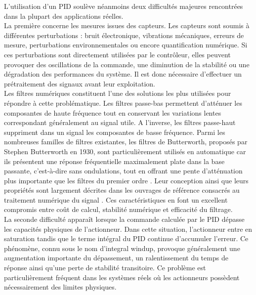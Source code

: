 L'utilisation d'un PID soulève néanmoins deux difficultés majeures rencontrées dans la plupart des applications réelles. \\

La première concerne les mesures issues des capteurs. Les capteurs sont soumis à différentes perturbations : bruit électronique, vibrations mécaniques, erreurs de mesure, perturbations environnementales ou encore quantification numérique. Si ces perturbations sont directement utilisées par le contrôleur, elles peuvent provoquer des oscillations de la commande, une diminution de la stabilité ou une dégradation des performances du système. Il est donc nécessaire d'effectuer un prétraitement des signaux avant leur exploitation. \\

Les filtres numériques constituent l'une des solutions les plus utilisées pour répondre à cette problématique. Les filtres passe-bas permettent d'atténuer les composantes de haute fréquence tout en conservant les variations lentes correspondant généralement au signal utile. 
A l'inverse, les filtres passe-haut suppriment dans un signal les composantes de basse fréquence. Parmi les nombreuses familles de filtres existantes, les filtres de Butterworth, proposés par Stephen Butterworth en 1930, sont particulièrement utilisés en automatique car ils présentent une réponse fréquentielle maximalement plate dans la base passante, c'est-à-dire sans ondulations, tout en offrant une pente d'atténuation plus importante que les filtres du premier ordre \cite{butterworth1930}. Leur conception ainsi que leurs propriétés sont largement décrites dans les ouvrages de référence consacrés au traitement numérique du signal \cite{oppenheim2010,orfanidis1996}. Ces caractéristiques en font un excellent compromis entre coût de calcul, stabilité numérique et efficacité du filtrage. \\


La seconde difficulté apparaît lorsque la commande calculée par le PID dépasse les capacités physiques de l'actionneur. Dans cette situation, l'actionneur entre en saturation tandis que le terme intégral du PID continue d'accumuler l'erreur. Ce phénomène, connu sous le nom d'integral windup, provoque généralement une augmentation importante du dépassement, un ralentissement du temps de réponse ainsi qu'une perte de stabilité transitoire. Ce problème est particulièrement fréquent dans les systèmes réels où les actionneurs possèdent nécessairement des limites physiques. \\


